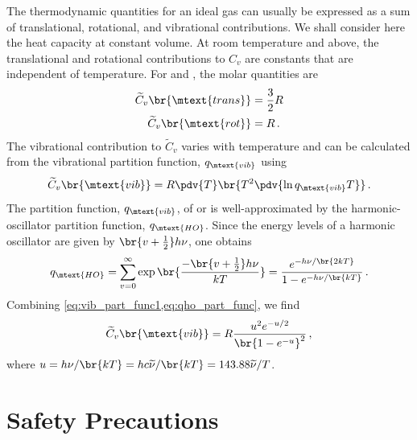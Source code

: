 The thermodynamic quantities for an ideal gas can usually be expressed as a sum of translational, rotational, and vibrational contributions. 
We shall consider here the heat capacity at constant volume. 
At room temperature and above, the translational and rotational contributions to \( C_v \) are constants that are independent of temperature. 
For  and , the molar quantities are 
\begin{align}
	\begin{split}
		\widetilde{C}_v\br{\mtext{trans}}	&=	\frac{3}{2}R \\
		\widetilde{C}_v\br{\mtext{rot}}		&=	R \, .
	\end{split}
	\label{eq:c_v_rot_vib}
\end{align}
The vibrational contribution to \( \widetilde{C}_v \) varies with temperature and can be calculated from the vibrational partition function, \( q_\mtext{vib} \) using 
\begin{equation}
	\widetilde{C}_v\br{\mtext{vib}} = R \pdv{T}\br{T^2 \pdv{\ln{q_\mtext{vib}}{T}}} \, .
	\label{eq:vib_part_func1}
\end{equation}
The partition function, \( q_\mtext{vib} \), of  or  is well-approximated by the harmonic-oscillator partition function, \( q_\mtext{HO} \). 
Since the energy levels of a harmonic oscillator are given by \( \br{v + \tfrac{1}{2}} h \nu \), one obtains~\autocite{levine95}
\begin{equation}
	q_\mtext{HO} = \sum_{v = 0}^\infty \exp \br{\frac{-\br{v + \tfrac{1}{2}} h \nu}{k T}} = \frac{e^{-h \nu/\br{2kT}}}{{1 - e^{-h \nu / \br{k T}}}} \, .
	\label{eq:qho_part_func}
\end{equation}
Combining \cref{eq:vib_part_func1,eq:qho_part_func}, we find 
\begin{equation}
	\widetilde{C}_v\br{\mtext{vib}} = R \frac{u^2 e^{-u/2}}{\br{1 - e^{-u}}^2} \, ,
	\label{eq:vib_part_func2}
\end{equation}
where \( u = h \nu / \br{kT} = h c \widetilde{\nu} / \br{k T} = 143.88 \widetilde{\nu} / T \). 




\pagebreak

\section{Safety Precautions} %
\label{sec:safety}

